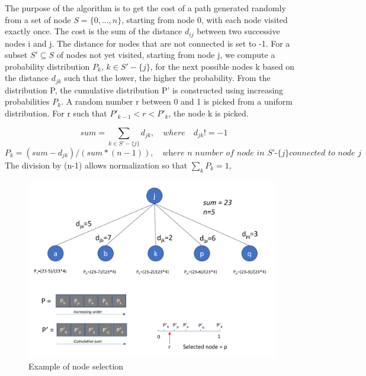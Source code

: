 \documentclass[../report.tex]{subfiles}
\begin{document}
The purpose of the algorithm is to get the cost of a path generated randomly from a set of node $S=\{0,...,n\}$, starting from node 0, with each node visited exactly once. The cost is the sum of the distance $d_{ij}$ between two successive nodes i and j. The distance for nodes that are not connected is set to -1.
\newline{} 
For a subset $S'\subseteq S$ of nodes not yet visited, starting from node j, we compute a probability distribution $P_{k}$, $k \in S'-\{j\}$, for the next possible nodes k based on the distance $d_{jk}$ such that the lower, the higher the probability. From the distribution P, the cumulative distribution P' is constructed using increasing probabilities $P_{k}$.  A random number r between 0 and 1 is picked from a uniform distribution. For r such that $P'_{k-1}< r <P'_{k}$, the node k is picked.


\[ sum = \sum_{k \in S'-\{j\}} d_{jk}, \quad {where} \quad d_{jk}!=-1 \]   
\[ P_{k} = (sum - d_{jk})/(sum*(n-1)), \quad \textit{where n number of node in S'-\{j\} connected to node j}\]
The division by (n-1) allows normalization so that $\sum_{k} P_{k}=1$,

\begin{figure}[ht]
\centering
\includegraphics[width=11cm]{Images/random_algo.jpg}
\caption{Example of node selection \label{overflow}}
\end{figure}
\end{document}
